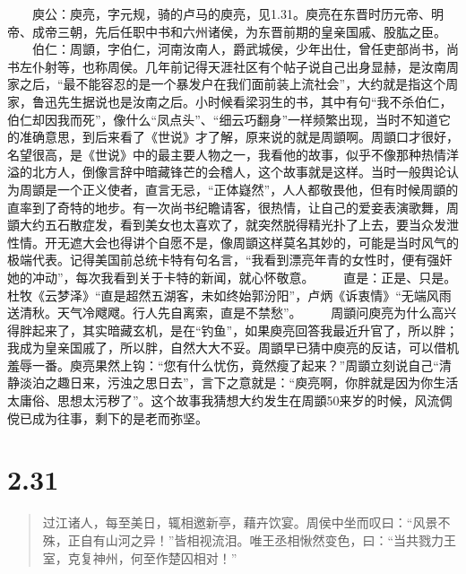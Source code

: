 \documentclass[]{book}
\begin{document}
　　庾公：庾亮，字元规，骑的卢马的庾亮，见1.31。庾亮在东晋时历元帝、明帝、成帝三朝，先后任职中书和六州诸侯，为东晋前期的皇亲国戚、股肱之臣。
　　伯仁：周顗，字伯仁，河南汝南人，爵武城侯，少年出仕，曾任吏部尚书，尚书左仆射等，也称周侯。几年前记得天涯社区有个帖子说自己出身显赫，是汝南周家之后，``最不能容忍的是一个暴发户在我们面前装上流社会''，大约就是指这个周家，鲁迅先生据说也是汝南之后。小时候看梁羽生的书，其中有句``我不杀伯仁，伯仁却因我而死''，像什么``凤点头''、``细云巧翻身''一样频繁出现，当时不知道它的准确意思，到后来看了《世说》才了解，原来说的就是周顗啊。周顗口才很好，名望很高，是《世说》中的最主要人物之一，我看他的故事，似乎不像那种热情洋溢的北方人，倒像言辞中暗藏锋芒的会稽人，这个故事就是这样。当时一般舆论认为周顗是一个正义使者，直言无忌，``正体嶷然''，人人都敬畏他，但有时候周顗的直率到了奇特的地步。有一次尚书纪瞻请客，很热情，让自己的爱妾表演歌舞，周顗大约五石散症发，看到美女也太喜欢了，就突然脱得精光扑了上去，要当众发泄性情。开无遮大会也得讲个自愿不是，像周顗这样莫名其妙的，可能是当时风气的极端代表。记得美国前总统卡特有句名言，``我看到漂亮年青的女性时，便有强奸她的冲动''，每次我看到关于卡特的新闻，就心怀敬意。
　　直是：正是、只是。杜牧《云梦泽》``直是超然五湖客，未如终始郭汾阳''，卢炳《诉衷情》``无端风雨送清秋。天气冷飕飕。行人先自离索，直是不禁愁''。
　　周顗问庾亮为什么高兴得胖起来了，其实暗藏玄机，是在``钓鱼''，如果庾亮回答我最近升官了，所以胖；我成为皇亲国戚了，所以胖，自然大大不妥。周顗早已猜中庾亮的反诘，可以借机羞辱一番。庾亮果然上钩：``您有什么忧伤，竟然瘦了起来？''周顗立刻说自己``清静淡泊之趣日来，污浊之思日去''，言下之意就是：``庾亮啊，你胖就是因为你生活太庸俗、思想太污秽了''。这个故事我猜想大约发生在周顗50来岁的时候，风流倜傥已成为往事，剩下的是老而弥坚。

\section{2.31}\label{section-77}

\begin{quote}
过江诸人，每至美日，辄相邀新亭，藉卉饮宴。周侯中坐而叹曰：``风景不殊，正自有山河之异！''皆相视流泪。唯王丞相愀然变色，曰：``当共戮力王室，克复神州，何至作楚囚相对！''
\end{quote}
\end{document}
